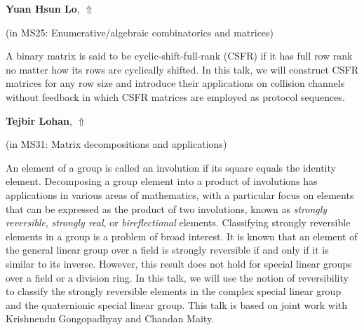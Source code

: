 \documentclass[ILAS2025-program.tex]{subfiles}
\begin{document}
\hypertarget{down0367}{}\begin{ilasabstract}
    
\textbf{Yuan Hsun Lo},  \hfill \hyperlink{up0367}{$\Uparrow$}
    
    
(in {\color{mstitle}MS25: Enumerative/algebraic combinatorics and matrices})
        
\mtskip
    A binary matrix is said to be cyclic-shift-full-rank (CSFR) if it has full row rank no matter how its rows are cyclically shifted.
In this talk, we will construct CSFR matrices for any row size and introduce their applications on collision channels without feedback in which CSFR matrices are employed as protocol sequences.

\end{ilasabstract}
    

\hypertarget{down0309}{}\begin{ilasabstract}
    
\textbf{Tejbir Lohan},  \hfill \hyperlink{up0309}{$\Uparrow$}
    
    
(in {\color{mstitle}MS31: Matrix decompositions and applications})
        
\mtskip
    An element of a group is called an involution if its square equals the identity element. Decomposing a group element into a product of involutions has applications in various areas of mathematics, with a particular focus on elements that can be expressed as the product of two involutions, known as \textit{strongly reversible}, \textit{strongly real}, or \textit{bireflectional} elements. Classifying strongly reversible elements in a group is a problem of broad interest. It is known that an element of the general linear group over a field is strongly reversible if and only if it is similar to its inverse. However, this result does not hold for special linear groups over a field or a division ring. In this talk, we will use the notion of reversibility to classify the strongly reversible elements in the complex special linear group and the quaternionic special linear group. This talk is based on joint work with Krishnendu Gongopadhyay and Chandan Maity.

\end{ilasabstract}
    
\end{document}
